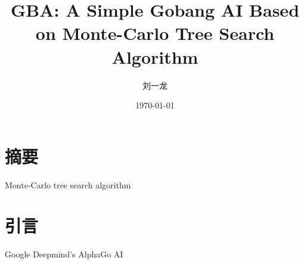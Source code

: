 \documentclass[UTF8]{ctexart}
\title{GBA: A Simple Gobang AI Based on Monte-Carlo Tree Search Algorithm}
\author{刘一龙}
\date{\today}
\begin{document}
\maketitle
\newpage
\tableofcontents
\newpage

\section*{摘要}
Monte-Carlo tree search algorithm\cite{DBLP:conf/ecml/KocsisS06}\cite{DBLP:conf/aiide/ChaslotBSS08}
\newpage

\section{引言}
Google Deepmind's AlphaGo AI\cite{DBLP:journals/nature/SilverHMGSDSAPL16}\cite{silver2017mastering}
\newpage



\end{document}

